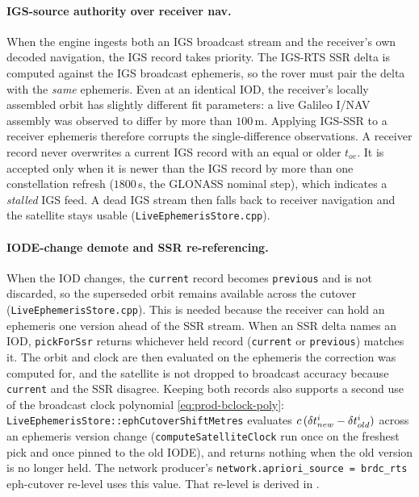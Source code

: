 \documentclass[main.tex]{subfiles}
\begin{document}
\paragraph{IGS-source authority over receiver nav.}
When the engine ingests both an IGS broadcast stream and the receiver's
own decoded navigation, the IGS record takes priority.  The IGS-RTS SSR
delta is computed against the IGS broadcast ephemeris, so the rover must
pair the delta with the \emph{same} ephemeris.  Even at an identical
IOD, the receiver's locally assembled orbit has slightly different fit
parameters: a live Galileo I/NAV assembly was observed to differ by more
than $100$\,m.  Applying IGS-SSR to a receiver ephemeris therefore
corrupts the single-difference observations.  A receiver record never
overwrites a current IGS record with an equal or older $t_{oe}$.  It is
accepted only when it is newer than the IGS record by more than one
constellation refresh ($1800$\,s, the GLONASS nominal step), which
indicates a \emph{stalled} IGS feed.  A dead IGS stream then falls back
to receiver navigation and the satellite stays usable
(\texttt{LiveEphemerisStore.cpp}).

\paragraph{IODE-change demote and SSR re-referencing.}
When the IOD changes, the \texttt{current} record becomes
\texttt{previous} and is not discarded, so the superseded orbit remains
available across the cutover (\texttt{LiveEphemerisStore.cpp}).  This is
needed because the receiver can hold an ephemeris one version ahead of
the SSR stream.  When an SSR delta names an IOD, \texttt{pickForSsr}
returns whichever held record (\texttt{current} or \texttt{previous})
matches it.  The orbit and clock are then evaluated on the ephemeris the
correction was computed for, and the satellite is not dropped to
broadcast accuracy because \texttt{current} and the SSR disagree.
Keeping both records also supports a second use of the broadcast clock
polynomial
\eqref{eq:prod-bclock-poly}:
\texttt{LiveEphemerisStore::ephCutoverShiftMetres} evaluates
$c\,(\delta t^{i}_{new}-\delta t^{i}_{old})$ across an
ephemeris version change (\texttt{computeSatelliteClock} run once on the
freshest pick and once pinned to the old IODE), and returns nothing
when the old version is no longer held.  The network producer's
\texttt{network.apriori\_source = brdc\_rts} eph-cutover re-level uses
this value.  That re-level is derived in
.
\end{document}

